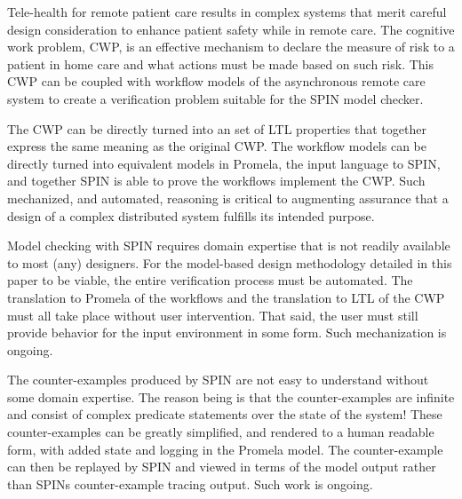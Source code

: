 Tele-health for remote patient care results in complex systems that merit careful design consideration to enhance patient safety while in remote care. The cognitive work problem, CWP, is an effective mechanism to declare the measure of risk to a patient in home care and what actions must be made based on such risk. This CWP can be coupled with workflow models of the asynchronous remote care system to create a verification problem suitable for the SPIN model checker.

The CWP can be directly turned into an set of LTL properties that together express the same meaning as the original CWP. The workflow models can be directly turned into equivalent models in Promela, the input language to SPIN, and together SPIN is able to prove the workflows implement the CWP. Such mechanized, and automated, reasoning is critical to augmenting assurance that a design of a complex distributed system fulfills its intended purpose. 

Model checking with SPIN requires domain expertise that is not readily available to most (any) designers. For the model-based design methodology detailed in this paper to be viable, the entire verification process must be automated. The translation to Promela of the workflows and the translation to LTL of the CWP must all take place without user intervention. That said, the user must still provide behavior for the input environment in some form. Such mechanization is ongoing.

The counter-examples produced by SPIN are not easy to understand without some domain expertise. The reason being is that the counter-examples are infinite and consist of complex predicate statements over the state of the system! These counter-examples can be greatly simplified, and rendered to a human readable form, with added state and logging in the Promela model. The counter-example can then be replayed by SPIN and viewed in terms of the model output rather than SPINs counter-example tracing output. Such work is ongoing.